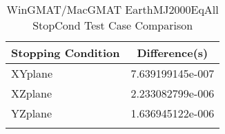 \begin{table}[htbp!]
\centering
\caption{ WinGMAT/MacGMAT EarthMJ2000EqAll StopCond Test Case Comparison}
      \begin{tabular}{lc}
      \hline\hline
          Stopping Condition & Difference(s) \\
         \hline
         XYplane & 7.639199145e-007 \\
         XZplane & 2.233082799e-006 \\
         YZplane & 1.636945122e-006 \\
      \hline\hline
      \label{Table: WinGMAT-MacGMAT EarthMJ2000EqAll StopCond Table} 
\end{tabular}
\end{table}
